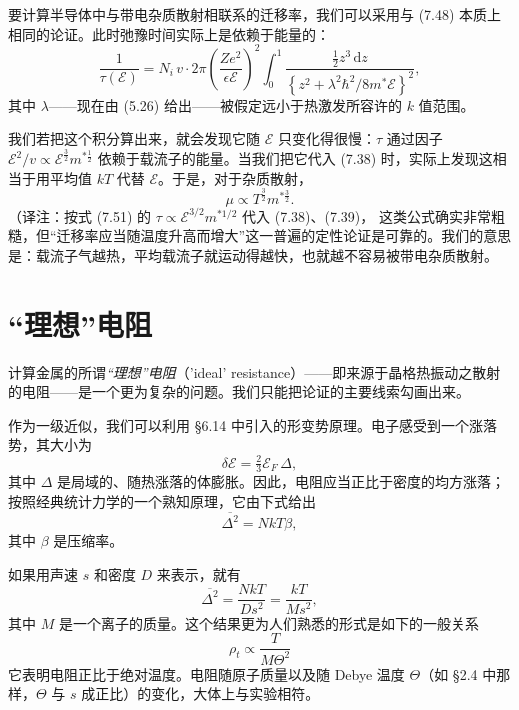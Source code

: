 要计算半导体中与带电杂质散射相联系的迁移率，我们可以采用与 (7.48) 本质上相同的论证。此时弛豫时间实际上是依赖于能量的：
\begin{equation*}
\frac{1}{\tau(\mathcal{E})}=N_{i}\,v\cdot 2\pi\left(\frac{Ze^{2}}{\epsilon\mathcal{E}}\right)^{2}\int_{0}^{1}\frac{\frac{1}{2}z^{3}\,\mathrm{d}z}{\left\{z^{2}+\lambda^{2}\hbar^{2}/8m^{*}\mathcal{E}\right\}^{2}},\tag{7.51}
\end{equation*}
其中 $\lambda$——现在由 (5.26) 给出——被假定远小于热激发所容许的 $k$ 值范围。

我们若把这个积分算出来，就会发现它随 $\mathcal{E}$ 只变化得很慢：$\tau$ 通过因子 $\mathcal{E}^{2}/v\propto\mathcal{E}^{\frac{3}{2}}m^{*\frac{1}{2}}$ 依赖于载流子的能量。当我们把它代入 (7.38) 时，实际上发现这相当于用平均值 $kT$ 代替 $\mathcal{E}$。于是，对于杂质散射，
\begin{equation*}
\mu\propto T^{\frac{3}{2}}m^{*\frac{3}{2}}.\tag{7.52}
\end{equation*}
（译注：按式 (7.51) 的 $\tau\propto\mathcal{E}^{3/2}m^{*1/2}$ 代入 (7.38)、(7.39)，
这类公式确实非常粗糙，但“迁移率应当随温度升高而增大”这一普遍的定性论证是可靠的。我们的意思是：载流子气越热，平均载流子就运动得越快，也就越不容易被带电杂质散射。

\section{“理想”电阻}

计算金属的所谓\emph{“理想”电阻}（'ideal' resistance）——即来源于晶格热振动之散射的电阻——是一个更为复杂的问题。我们只能把论证的主要线索勾画出来。

作为一级近似，我们可以利用 §6.14 中引入的形变势原理。电子感受到一个涨落势，其大小为
\begin{equation*}
\delta\mathcal{E}=\tfrac{2}{3}\mathcal{E}_{F}\,\Delta,\tag{7.53}
\end{equation*}
其中 $\Delta$ 是局域的、随热涨落的体膨胀。因此，电阻应当正比于密度的均方涨落；按照经典统计力学的一个熟知原理，它由下式给出
\begin{equation*}
\overline{\Delta^{2}}=NkT\beta,\tag{7.54}
\end{equation*}
其中 $\beta$ 是压缩率。

如果用声速 $s$ 和密度 $D$ 来表示，就有
\begin{equation*}
\overline{\Delta^{2}}=\frac{NkT}{Ds^{2}}=\frac{kT}{Ms^{2}},\tag{7.55}
\end{equation*}
其中 $M$ 是一个离子的质量。这个结果更为人们熟悉的形式是如下的一般关系
\begin{equation*}
\rho_{t}\propto\frac{T}{M\Theta^{2}}\tag{7.56}
\end{equation*}
它表明电阻正比于绝对温度。电阻随原子质量以及随 Debye 温度 $\Theta$（如 §2.4 中那样，$\Theta$ 与 $s$ 成正比）的变化，大体上与实验相符。

